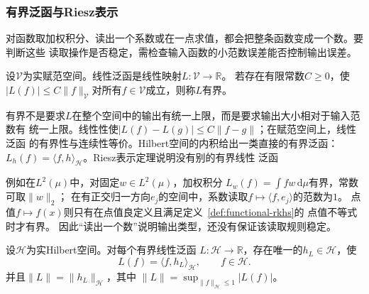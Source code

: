 \subsubsection{有界泛函与Riesz表示}

对函数取加权积分、读出一个系数或在一点求值，都会把整条函数变成一个数。要判断这些
读取操作是否稳定，需检查输入函数的小范数误差能否控制输出误差。
\begin{definition}[有界线性泛函]
\label{def:functional-bounded-linear-functional}
设$\mathcal V$为实赋范空间。线性泛函是线性映射$L:\mathcal V\to\mathbb R$。
若存在有限常数$C\geq0$，使
$|L(f)|\leq C\lVert f\rVert_{\mathcal V}$对所有$f\in\mathcal V$成立，则称$L$有界。
\end{definition}
有界不是要求$L$在整个空间中的输出有统一上限，而是要求输出大小相对于输入范数有
统一上限。线性性使$|L(f)-L(g)|\leq C\lVert f-g\rVert$；在赋范空间上，线性泛函
的有界性与连续性等价。Hilbert空间的内积给出一类直接的有界泛函：
$L_h(f)=\langle f,h\rangle_{\mathcal{H}}$。Riesz表示定理说明没有别的有界线性
泛函

例如在$L^2(\mu)$中，对固定$w\in L^2(\mu)$，加权积分
$L_w(f)=\int fw\,\mathrm d\mu$有界，常数可取$\lVert w\rVert_2$；
在有正交归一方向$e_j$的空间中，系数读取$f\mapsto\langle f,e_j\rangle$的范数为$1$。
点值$f\mapsto f(x)$则只有在点值良定义且满足定义~\ref{def:functional-rkhs}的
点值不等式时才有界。
因此“读出一个数”说明输出类型，还没有保证该读取规则稳定。

\begin{theorem}[Riesz表示定理]
\label{thm:functional-riesz-representation}
设$\mathcal{H}$为实Hilbert空间。对每个有界线性泛函
$L:\mathcal{H}\to\mathbb{R}$，存在唯一的$h_L\in\mathcal{H}$，使
\begin{equation}
  L(f)=\langle f,h_L\rangle_{\mathcal{H}},
  \qquad f\in\mathcal{H}.
  \label{eq:functional-riesz-representation}
\end{equation}
并且$\lVert L\rVert=\lVert h_L\rVert_{\mathcal{H}}$，其中
$\lVert L\rVert=\sup_{\lVert f\rVert_{\mathcal{H}}\leq1}|L(f)|$。
\end{theorem}

